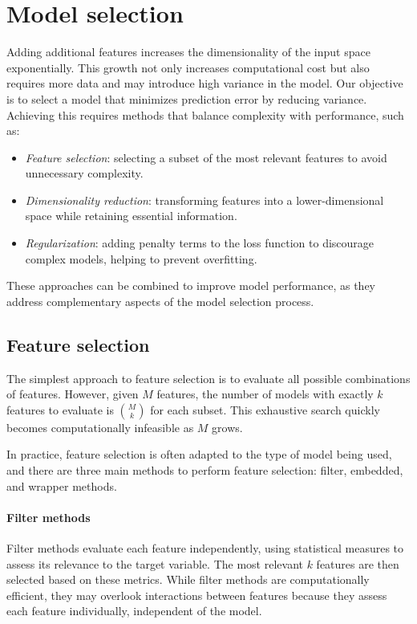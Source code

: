 \section{Model selection}

Adding additional features increases the dimensionality of the input space exponentially. 
This growth not only increases computational cost but also requires more data and may introduce high variance in the model.
Our objective is to select a model that minimizes prediction error by reducing variance. 
Achieving this requires methods that balance complexity with performance, such as:
\begin{itemize}
    \item \textit{Feature selection}: selecting a subset of the most relevant features to avoid unnecessary complexity.
    \item \textit{Dimensionality reduction}: transforming features into a lower-dimensional space while retaining essential information.
    \item \textit{Regularization}: adding penalty terms to the loss function to discourage complex models, helping to prevent overfitting.
\end{itemize}
These approaches can be combined to improve model performance, as they address complementary aspects of the model selection process.

\subsection{Feature selection}
The simplest approach to feature selection is to evaluate all possible combinations of features. 
However, given $M$ features, the number of models with exactly $k$ features to evaluate is $\binom{M}{k}$ for each subset. 
This exhaustive search quickly becomes computationally infeasible as $M$ grows.

In practice, feature selection is often adapted to the type of model being used, and there are three main methods to perform feature selection: filter, embedded, and wrapper methods.

\paragraph*{Filter methods}
Filter methods evaluate each feature independently, using statistical measures to assess its relevance to the target variable. 
The most relevant $k$ features are then selected based on these metrics. 
While filter methods are computationally efficient, they may overlook interactions between features because they assess each feature individually, independent of the model.

